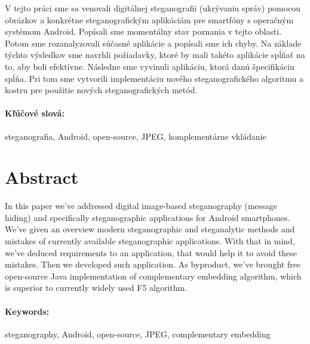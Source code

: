 \documentclass[12pt, oneside]{book}
\begin{document}
V tejto práci sme sa venovali digitálnej steganografii (ukrývaniu správ) pomocou obrázkov  
a konkrétne steganografickým aplikáciám pre smartfóny s operačným systémom Android.  
Popísali sme momentálny stav poznania v tejto oblasti.  
Potom sme rozanalyzovali súčasné aplikácie 
a popísali sme ich chyby. Na základe týchto výsledkov sme navrhli  
požiadavky, ktoré by mali takéto aplikácie spĺňať na to, aby boli efektívne. Následne 
sme vyvinuli aplikáciu, ktorá danú špecifikáciu spĺňa.  
Pri tom sme vytvorili implementáciu nového steganografického algoritmu a kostru 
pre použitie nových steganografických metód.



\paragraph*{Kľúčové slová:} steganografia, Android, open-source, JPEG, komplementárne vkládanie 


\newpage 
\section*{Abstract}

In this paper we've addressed digital image-based steganography (message hiding) and 
specifically steganographic applications for Android smartphones. We've given an overview modern
steganographic and steganalytic methods and mistakes of currently available steganographic
applications. With that in mind, we've deduced requirements to an application, that would
help it to avoid these mistakes. Then we developed such application. As byproduct, we've
brought free open-source Java implementation of complementary embedding algorithm, which
is superior to currently widely used F5 algorithm.


\paragraph*{Keywords:} steganography, Android, open-source, JPEG, complementary embedding



\newpage 

\tableofcontents

\end{document}
